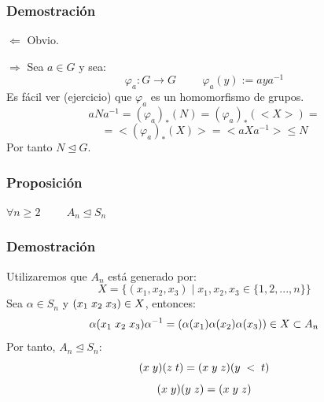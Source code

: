 \documentclass[11pt,a4paper]{article}
\begin{document}
\subsubsection*{Demostración}

\begin{enumerate*}
\item[$\Leftarrow$] Obvio.
\item[$\Rightarrow$] Sea $a \in G$ y sea:
$$\varphi_{a}: G \to G \hspace{1cm} \varphi_{a}(y) := aya^{-1}$$
Es fácil ver (ejercicio) que $\varphi_{a}$ es un homomorfismo de grupos.
$$aNa^{-1} = (\varphi_{a})_{*}(N) = (\varphi_{a})_{*}(<X>) =$$ $$= <(\varphi_{a})_{*}(X)> = <aXa^{-1}> \leqslant N$$
Por tanto $N \unlhd G$.
\end{enumerate*}

\subsubsection*{Proposición}

$\forall n \geq 2 \hspace{1cm} A_{n} \unlhd S_{n}$

\subsubsection*{Demostración}

Utilizaremos que $A_{n}$ está generado por:
$$X = \{(x_{1}, x_{2}, x_{3}) \mid x_{1}, x_{2}, x_{3} \in \{1, 2, ..., n\}\}$$
Sea $\alpha \in S_{n}$ y $(x_{1} \hspace{0.1cm} x_{2} \hspace{0.1cm} x_{3}) \in X$, entonces:
$$\alpha(x_{1} \hspace{0.1cm} x_{2} \hspace{0.1cm} x_{3}) \alpha^{-1} = (\alpha(x_{1}) \alpha(x_{2}) \alpha(x_{3})) \in X \subset A_{n}$$
Por tanto, $A_{n} \unlhd S_{n}$:
$$(x \hspace{0.1cm} y)(z \hspace{0.1cm} t) = (x \hspace{0.1cm} y \hspace{0.1cm} z)(y \hspace{0.1cm} < \hspace{0.1cm} t)$$
$$(x \hspace{0.1cm} y)(y \hspace{0.1cm} z) = (x \hspace{0.1cm} y \hspace{0.1cm} z)$$
\end{document}
